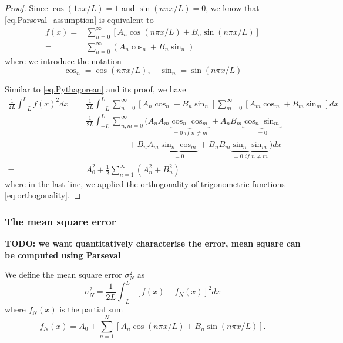 \begin{proof}
    Since $\cos (1 \pi x / L) = 1$ and $\sin (n \pi x / L) = 0$, we know that \eqref{eq.Parseval_assumption} is equivalent to 
    \begin{equation}\label{eq.proof_Parseval_1}
        \begin{split}
            f(x) =& \sum_{n=0}^{\infty}[A_n \cos (n \pi x / L)+B_n \sin (n \pi x / L)]
            \\
            =&\sum_{n=0}^{\infty}(A_n \cos_n +B_n \sin_n)
        \end{split}
    \end{equation}
    where we introduce the notation
    \begin{equation}\label{eq.proof_Parseval_2}
        \cos_n = \cos (n \pi x / L),\quad \sin_n = \sin (n \pi x / L)
    \end{equation}

    Similar to \eqref{eq.Pythagorean} and its proof, we have 
    \begin{equation}\label{eq.proof_Parseval_3}
        \begin{split}
            \frac{1}{2 L} \int_{-L}^L f(x)^2 d x 
            =& \frac{1}{2 L} \int_{-L}^L \sum_{n=0}^{\infty}[A_n \cos_n+B_n \sin_n] \sum_{m=0}^{\infty}[A_m \cos_m+B_m \sin_m] d x
            \\
            =&\frac{1}{2 L} \int_{-L}^L \sum_{n,m=0}^{\infty}(A_nA_m \underbrace{\cos_n\cos_m}_{= 0\textit{ if }n\neq m} + A_nB_m\underbrace{\cos_n\sin_m}_{=0} 
            \\
            &\qquad\qquad\quad+ B_nA_m\underbrace{\sin_n\cos_m}_{=0} + B_nB_m\underbrace{\sin_n\sin_m}_{= 0\textit{ if }n\neq m}) d x
            \\
            =&A_0^2+\frac{1}{2} \sum_{n=1}^{\infty}\left(A_n^2+B_n^2\right)
        \end{split}
    \end{equation}
    where in the last line, we applied the orthogonality of trigonometric functions \eqref{eq.orthogonality}.
\end{proof}

\subsubsection{The mean square error}

\textbf{TODO: we want quantitatively characterise the error, mean square can be computed using Parseval}


We define the mean square error $\sigma_N^2$ as
\begin{equation}\label{eq.mean_square_error}
    \sigma_N^2=\frac{1}{2 L} \int_{-L}^L\left[f(x)-f_N(x)\right]^2 d x
\end{equation}
where $f_N(x)$ is the partial sum
\begin{equation}
    f_N(x)=A_0+\sum_{n=1}^N\left[A_n \cos (n \pi x / L)+B_n \sin (n \pi x / L)\right] .
\end{equation}

